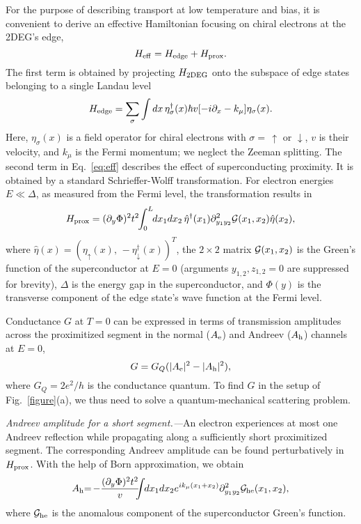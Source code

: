 \documentclass[reprint,
superscriptaddress,
amsmath,
amssymb,
aps,
prl,
floatfix,
english
]{revtex4-2}
\newcommand{\tdeg}{{\rm 2DEG}}
\newcommand{\prox}{{\rm prox}}
\newcommand{\kf}{k_\mu}
\newcommand{\he}{A_{\rm h}}
\newcommand{\ee}{A_{\rm e}}
\newcommand{\psie}{\eta}
\newcommand{\edg}{{\rm edge}}
\begin{document}
For the purpose of describing transport at low temperature and bias, it is convenient to derive an effective Hamiltonian focusing on chiral electrons at the 2DEG's edge,
\begin{equation}\label{eq:eff}
    H_{\rm eff} = H_\edg + H_\prox.
\end{equation}
The first term is obtained by projecting $H_\tdeg$ onto the subspace of edge states belonging to a single Landau level
\begin{equation}
    H_\edg = \sum_\sigma \int dx\,\psie^\dagger_\sigma(x) \hbar v[-i\partial_x - \kf]\psie_\sigma(x).
\end{equation}
Here, $\eta_\sigma(x)$ is a field operator for chiral electrons with $\sigma = \,\uparrow$ or $\downarrow$, $v$ is their velocity, and $k_\mu$ is the Fermi momentum; we neglect the Zeeman splitting. The second term in Eq.~\eqref{eq:eff} describes the effect of superconducting proximity. It is obtained by a standard Schrieffer-Wolff transformation.
For electron energies $E \ll \Delta$, as measured from the Fermi level, the transformation results in
\begin{equation}
    H_\prox = (\partial_y \Phi)^2 t^2\hspace{-0.10cm}\int_0^L\hspace{-0.10cm} dx_1 dx_2\, \hat{\psie}^\dagger(x_1) \partial^2_{y_1 y_2} {\cal G} (x_1,x_2) \hat{\psie}(x_2),
\end{equation}
where $\hat{\psie}(x) = (\psie_\uparrow (x),\,-\psie_\downarrow^\dagger(x))^T$, the $2\times 2$ matrix ${\cal G}(x_1, x_2)$ is the Green's function of the superconductor at $E = 0$ (arguments $y_{1,2}, z_{1,2} = 0$ are suppressed for brevity), $\Delta$ is the energy gap in the superconductor, and $\Phi(y)$ is the transverse component of the edge state's wave function at the Fermi level.

Conductance $G$ at $T = 0$ can be expressed in terms of transmission amplitudes across the proximitized segment in the normal ($\ee$) and Andreev ($\he$) channels
at $E = 0$,
\begin{equation}\label{eq:G}
    G = G_Q (|\ee|^2 - |\he|^2),
\end{equation}
where $G_Q = 2e^2 / h$ is the conductance quantum.
To find $G$ in the setup of Fig.~\ref{figure}(a), we thus need to solve a quantum-mechanical scattering problem.

\textit{Andreev amplitude for a short segment.---}An electron experiences at most one Andreev reflection  while propagating along a sufficiently short proximitized segment. The corresponding Andreev amplitude can be found perturbatively in $H_{\rm prox}$. With the help of Born approximation, we obtain
\begin{equation}\label{eq:damp}
    \he \hspace{-0.1cm} =\hspace{-0.05cm} -\frac{(\partial_y \Phi)^2 t^2}{v}\hspace{-0.2cm}\int \hspace{-0.1cm} dx_1 dx_2 e^{i\kf (x_1 + x_2)}\partial^2_{y_1 y_2}{\cal G}_{\rm he} (x_1, x_2),
\end{equation}
where ${\cal G}_{\rm he}$ is the anomalous component of the superconductor Green's function.
\end{document}
